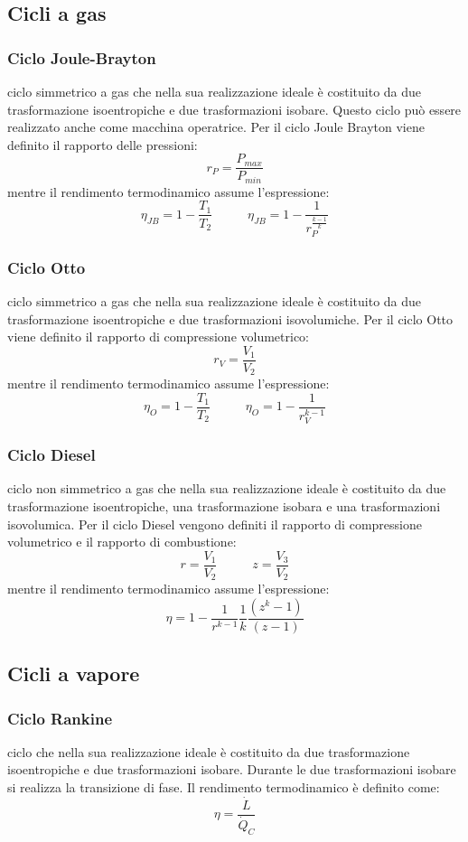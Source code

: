 \subsection{Cicli a gas}
\subsubsection{Ciclo Joule-Brayton}
ciclo simmetrico a gas che nella sua realizzazione ideale è costituito da
due trasformazione isoentropiche e due trasformazioni isobare. Questo ciclo può essere
realizzato anche come macchina operatrice. \newline
Per il ciclo Joule Brayton viene definito il rapporto delle pressioni:
\[
    r_P = \frac{P_{max}}{P_{min}}
\]
mentre il rendimento termodinamico assume l'espressione:
\[
    \eta_{JB} = 1- \frac{T_1}{T_2} \;\;\;\;\;\;\;\;\;\;\eta_{JB} = 1- \frac{1}{r_P^{\frac{k-1}{k}}}
\]
\subsubsection{Ciclo Otto}
ciclo simmetrico a gas che nella sua realizzazione ideale è costituito da due
trasformazione isoentropiche e due trasformazioni isovolumiche. \newline
Per il ciclo Otto viene definito il rapporto di compressione volumetrico:
\[
    r_V = \frac{V_1}{V_2}
\]
mentre il rendimento termodinamico assume l'espressione:
\[
    \eta_{O} = 1- \frac{T_1}{T_2} \;\;\;\;\;\;\;\;\;\; \eta_{O} = 1- \frac{1}{r_V^{k-1}}
\]
\subsubsection{Ciclo Diesel}
ciclo non simmetrico a gas che nella sua realizzazione ideale è costituito da due
trasformazione isoentropiche, una trasformazione isobara e una trasformazioni isovolumica. \newline
Per il ciclo Diesel vengono definiti il rapporto di compressione volumetrico e il rapporto di
combustione: 
\[
    r= \frac{V_1}{V_2} \;\;\;\;\;\;\;\;\;\;z = \frac{V_3}{V_2}
\]
mentre il rendimento termodinamico assume l'espressione:
\[
    \eta = 1- \frac{1}{r^{k-1}} \frac{1}{k} \frac{(z^k - 1)}{(z-1)}
\]
\subsection{Cicli a vapore}
\subsubsection{Ciclo Rankine}
ciclo che nella sua realizzazione ideale è costituito da due trasformazione
isoentropiche e due trasformazioni isobare. Durante le due trasformazioni isobare si realizza
la transizione di fase. \newline
Il rendimento termodinamico è definito come:
\[
    \eta = \frac{\dot{L}}{\dot{Q}_C}
\]
